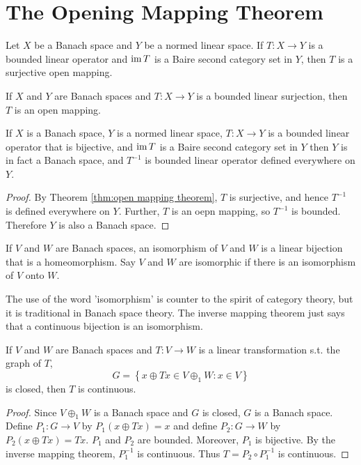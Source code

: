 \section{The Opening Mapping Theorem}



\begin{theorem}\label{thm:open mapping theorem}
    Let $X$ be a Banach space and $Y$ be a normed linear space. If $T:X\to Y$ is a bounded linear operator and $\operatorname{im}{T}$ is a Baire second category set in $Y$,
    then $T$ is a surjective open mapping.
\end{theorem}
\begin{corollary}
    If $X$ and $Y$ are Banach spaces and $T:X\to Y$ is a bounded linear surjection,
    then $T$ is an open mapping.
\end{corollary}


\begin{theorem}
    If $X$ is a Banach space, $Y$ is a normed linear space, $T:X\to Y$ is a bounded linear operator that is bijective, and $\operatorname{im}{T}$ is a Baire second category set in $Y$
    then $Y$ is in fact a Banach space, and $T^{-1}$ is bounded linear operator defined everywhere on $Y$.
\end{theorem}
\begin{proof}
    By Theorem \ref{thm:open mapping theorem}, $T$ is surjective, and hence $T^{-1}$ is defined everywhere on $Y$.
    Further, $T$ is an oepn mapping, so $T^{-1}$ is bounded. Therefore $Y$ is also a Banach space.
\end{proof}

\begin{definition}
    If $V$ and $W$ are Banach spaces, an isomorphism of $V$ and $W$ is a linear bijection that is a homeomorphism.
    Say $V$ and $W$ are isomorphic if there is an isomorphism of $V$ onto $W$.
\end{definition}
\begin{remark}
    The use of the word 'isomorphism' is counter to the spirit of category theory, but it is traditional in Banach 
    space theory. The inverse mapping theorem just says that a continuous bijection is an isomorphism.
\end{remark}


\begin{theorem}
    If $V$ and $W$ are Banach spaces and $T:V\to W$ is a linear transformation s.t. the graph of $T$,
    \[ G=\left\{x\oplus Tx\in V\oplus_1 W: x\in V\right\}\] 
    is closed, then $T$ is continuous.
\end{theorem}
\begin{proof}
    Since $V\oplus_1 W$ is a Banach space and $G$ is closed, $G$ is a Banach space.
    Define $P_1:G\to V$ by $P_1(x\oplus Tx)=x$ and define $P_2:G\to W$ by $P_2(x\oplus Tx)=Tx$. 
    $P_1$ and $P_2$ are bounded. Moreover, $P_1$ is bijective. By the inverse mapping theorem, $P_1^{-1}$ is continuous. 
    Thus $T=P_2\circ P_1^{-1}$ is continuous.
\end{proof}


